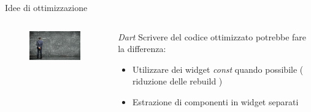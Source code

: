 \documentclass{../libs/presentation_format}
\begin{document}

\begin{frame}{Idee di ottimizzazione}
	\begin{minipage}[0.2\textheight]{\textwidth}
		\begin{columns}[T]
			\begin{column}{0.4\textwidth}
				\begin{figure}[htpb]
					\centering
					\includegraphics[width=4cm]{../libs/making-decision}
				\end{figure}
			\end{column}
			\begin{column}{0.6\textwidth}
				\emph{Dart}
				\newline
				Scrivere del codice ottimizzato potrebbe fare la differenza:
				\begin{itemize}
					\item Utilizzare dei widget \emph{const} quando possibile ( riduzione delle rebuild )
					\item Estrazione di componenti in widget separati
				\end{itemize}
			\end{column}
		\end{columns}
	\end{minipage}
\end{frame}

\end{document}
